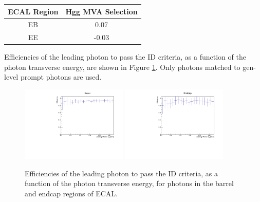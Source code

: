 \begin{table}[h]
\centering
\begin{tabular} { | c | c | }
\hline
ECAL Region & Hgg MVA Selection \\ \hline
EB & 0.07 \\ \hline
EE & -0.03 \\ \hline
\end{tabular}
\end{table}

Efficiencies of the leading photon to pass the ID criteria, as a function of the photon transverse energy, 
are shown in Figure \ref{fig:Hgg-PhoID-eff}. 
Only photons matched to gen-level prompt photons are used. 


\begin{figure}[thb]
  \centering
  \includegraphics[width=0.45\textwidth]{figures/sec-photons/SMHH_HggMVA_Eff_EB.pdf}\hfil
  \includegraphics[width=0.45\textwidth]{figures/sec-photons/SMHH_HggMVA_Eff_EE.pdf}\hfil
  \caption{Efficiencies of the leading photon to pass the ID criteria, as a function of the photon transverse energy, 
for photons in the barrel and endcap regions of ECAL. }
  \label{fig:Hgg-PhoID-eff}
\end{figure}




